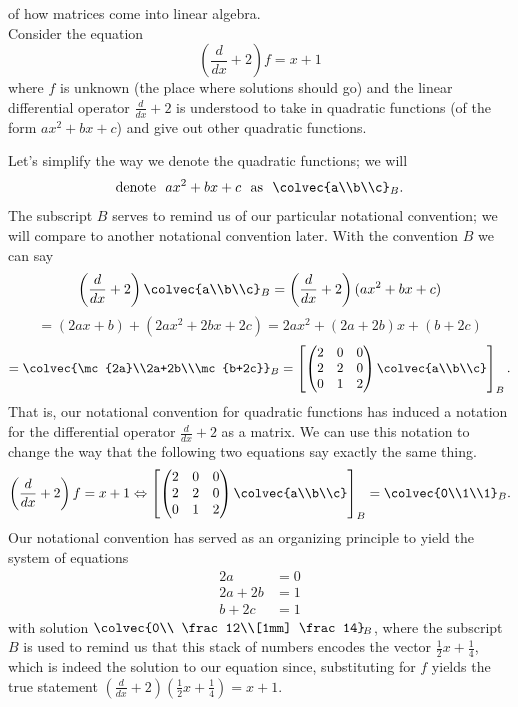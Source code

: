 \begin{example}{of how matrices come into linear algebra.}\\
Consider the equation
$$\left( \frac{d}{dx}+2\right) f= x+1$$
where $f$ is unknown (the place where solutions should go) and  the linear differential operator $\frac{d}{dx}+2$ is understood to take in quadratic functions (of the form $ax^2+bx+c$) and give out other quadratic functions. 

Let's simplify the way we denote the quadratic functions; 
we will  
$${\rm denote~~}ax^2+bx+c \text{~~as~~} \colvec{a\\b\\c}_B.$$
The subscript $B$ serves to remind us of our particular notational convention; we will compare to another notational convention later. With the convention $B$ we can say
$$  \left( \frac{d}{dx}+2\right) \colvec{a\\b\\c}_B
=\left( \frac{d}{dx}+2\right)(ax^2+bx+c)$$
$$
=(2ax+b)+(2ax^2+2bx+2c) = 2a x^2+(2a+2b)x+(b+2c)
$$
$$
=\colvec{\mc{2a}\\2a+2b\\\mc{b+2c}}_B
= 
\left[ 
\begin{pmatrix}   
2&0&0\\
2&2&0\\
0&1&2
\end{pmatrix}
\colvec{a\\b\\c}\right]_B.
$$
That is, our notational convention for quadratic functions has induced a notation for the differential operator $\frac{d}{dx}+2$ as a matrix. 
We can use this notation to change the way that 
the following two equations say exactly the same thing.
$$
 \left( \frac{d}{dx}+2\right) f=x+1
 \Leftrightarrow
\left[ 
\begin{pmatrix}   
2&0&0\\
2&2&0\\
0&1&2
\end{pmatrix}
\colvec{a\\b\\c}\right]_B = \colvec{0\\1\\1}_B.$$
Our notational convention has served as an organizing principle to yield the system of equations 
$$
\begin{array}{cc}
2a&=0\\
2a+2b&=1\\
b+2c&=1
\end{array}
$$
with solution $\colvec{0\\ \frac12\\[1mm] \frac14}_{\!B}  $, where the subscript $B$ is used to remind us that this stack of numbers  encodes the vector $\frac12x+\frac14$, which is indeed the  solution to our equation since, substituting for $f$ yields the true statement $\left(\frac{d}{dx}+2\right)(\frac12x+\frac14)=x+1$. 
\end{example}


